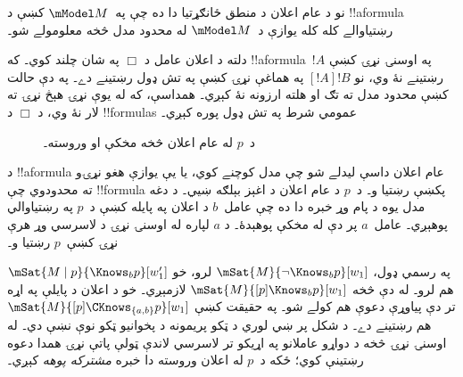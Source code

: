 \documentclass[../../../include/open-logic-section]{subfiles}
\begin{document}
نو د عام اعلان د منطق ځانګړتيا دا ده چې په~$\mModel M$ کښې د
!!a{formula} رښتياوالے کله کله يوازې د~$\mModel M$ له محدود
مدل څخه معلومولے شو۔

دلته د اعلان عامل د $\Box$ په شان چلند کوي۔ که !!a{formula}~$!A$
په اوسنۍ نړۍ کښې رښتينے نۀ وي، نو $[!A]!B$ په هماغې نړۍ کښې
په تش ډول رښتينے دے۔ په دې حالت کښې محدود مدل ته تګ او هلته
ارزونه نۀ کېږي۔ همداسې، که له يوې نړۍ هېڅ نړۍ ته لار نۀ وي،
د $\Box$ د !!{formula}s عمومي شرط په تش ډول پوره کېږي۔

\begin{figure}
  \begin{center}
  \end{center}
  \caption{د~$p$ له عام اعلان څخه مخکې او وروسته۔}
\end{figure}

د !!a{formula} عام اعلان داسې ليدلے شو چې مدل کوچنے کوي، يا يې
يوازې هغو نړۍو ته محدودوي چې !!{formula} پکښې رښتيا و۔
 د~$p$ د عام اعلان د اغېز بېلګه
ښيي۔ د دغه مدل يوه د پام وړ خبره دا ده چې عامل~$b$ د اعلان په
پايله کښې د~$p$ په رښتياوالي پوهېږي۔ عامل~$a$ پر دې له مخکې
پوهېدۀ۔ د $a$ لپاره له اوسنۍ نړۍ د لاسرسي وړ هرې نړۍ کښې~$p$
رښتيا و۔

په رسمي ډول، $\mSat{M}{\lnot \Knows_b p}[w_1]$ لرو، خو $\mSat{M
\mid p}{\Knows_b p}[w'_1]$ هم لرو۔ له دې څخه $\mSat{M}{[p] \Knows_b
p}[w_1]$ لازمېږي۔ خو د اعلان د پايلې په اړه تر دې پياوړې دعوې
هم کولے شو۔ په حقيقت کښې $\mSat{M}{[p]\CKnows_{\{a,b\}} p}[w_1]$
هم رښتينے دے۔ د شکل پر ښي لوري د ټکو پريمونه د پخوانيو ټکو
نوې نښې دي۔ له اوسنۍ نړۍ څخه د دواړو عاملانو په اړيکو تر لاسرسي
لاندې ټولې پاتې نړۍ همدا دعوه رښتينې کوي؛ ځکه د~$p$ له اعلان
وروسته دا خبره \emph{مشترکه پوهه} کېږي۔
\end{document}
